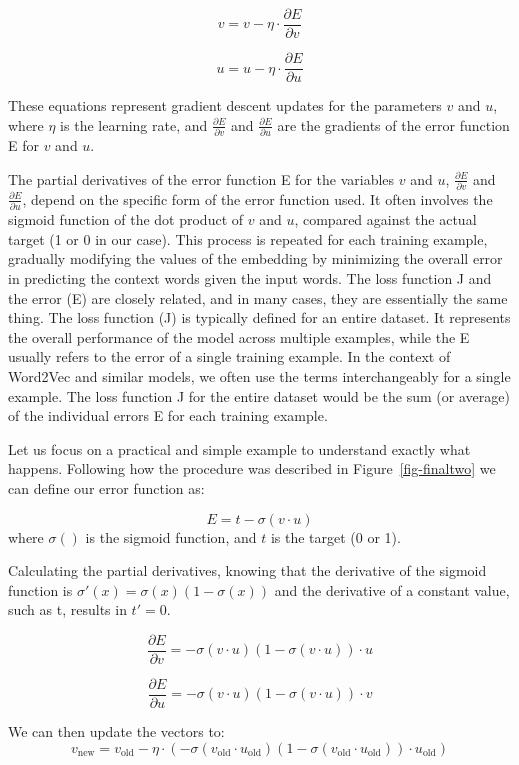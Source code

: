 \[
v = v - \eta \cdot \frac{\partial E}{\partial v}
\]

\[
u = u - \eta \cdot \frac{\partial E}{\partial u}
\]

These equations represent gradient descent updates for the parameters
\(v\) and \(u\), where \(\eta\) is the learning rate, and
\(\frac{\partial E}{\partial v}\) and \(\frac{\partial E}{\partial u}\)
are the gradients of the error function E for \(v\) and
\(u\).

The partial derivatives of the error function E for the
variables \(v\) and \(u\), \(\frac{\partial E}{\partial v}\) and
\(\frac{\partial E}{\partial u}\), depend on the specific form of the
error function used. It often involves the sigmoid function of the dot
product of \(v\) and \(u\), compared against the actual target (1 or 0
in our case). This process is repeated for each training example,
gradually modifying the values of the embedding by minimizing the
overall error in predicting the context words given the input words. The
loss function J and the error (E) are closely related, and in many cases,
they are essentially the same thing. The loss function (J) is typically
defined for an entire dataset. It represents the overall performance of
the model across multiple examples, while the E usually refers
to the error of a single training example. In the context of Word2Vec
and similar models, we often use the terms interchangeably for a single
example. The loss function J for the entire dataset would be the sum (or
average) of the individual errors E for each training example.

Let us focus on a practical and simple example to understand exactly
what happens. Following how the procedure was described in
Figure~\ref{fig-finaltwo} we can define our error function as:

\[
E = t - \sigma(v \cdot u)
\] where \(\sigma()\) is the sigmoid function, and \(t\) is the target
(0 or 1).

Calculating the partial derivatives, knowing that the derivative of the
sigmoid function is \(\sigma'(x) = \sigma(x)\left(1 - \sigma(x)\right)\)
and the derivative of a constant value, such as t, results in \(t'=0\).

\[
\frac{\partial E}{\partial v} = -\sigma(v \cdot u)(1 - \sigma(v \cdot u)) \cdot u
\]

\[
\frac{\partial E}{\partial u} = -\sigma(v \cdot u)(1 - \sigma(v \cdot u)) \cdot v
\]

We can then update the vectors to: \[
v_{\text{new}} = v_{\text{old}} - \eta \cdot \left(-\sigma(v_{\text{old}} \cdot u_{\text{old}})(1 - \sigma(v_{\text{old}} \cdot u_{\text{old}})) \cdot u_{\text{old}}\right)
\]

